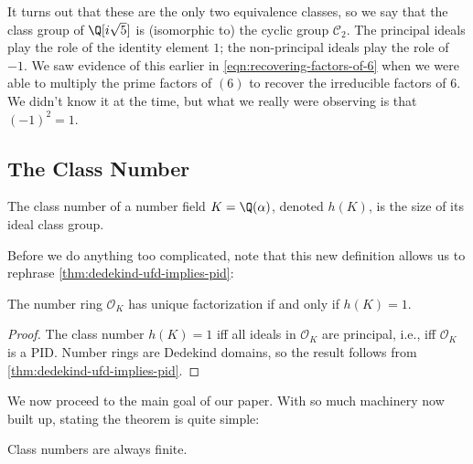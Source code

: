 It turns out that these are the only two equivalence classes, so we say that the class group of $\Q[i \sqrt 5]$ is (isomorphic to) the cyclic group $\mathcal C_2$.
The principal ideals play the role of the identity element $1$; the non-principal ideals play the role of $-1$.
We saw evidence of this earlier in \autoref{eqn:recovering-factors-of-6} when we were able to multiply the prime factors of $(6)$ to recover the irreducible factors of $6$.
We didn't know it at the time, but what we really were observing is that $(-1)^2 = 1$.

\subsection{The Class Number}

\begin{definition}
    The class number of a number field $K = \Q(\alpha)$, denoted $h(K)$, is the size of its ideal class group.
\end{definition}

Before we do anything too complicated, note that this new definition allows us to rephrase \autoref{thm:dedekind-ufd-implies-pid}:

\begin{theorem}
    The number ring $\mathcal O_K$ has unique factorization if and only if $h(K) = 1$.
\end{theorem}

\begin{proof}
    The class number $h(K) = 1$ iff all ideals in $\mathcal O_K$ are principal, i.e., iff $\mathcal O_K$ is a PID. Number rings are Dedekind domains, so the result follows from \autoref{thm:dedekind-ufd-implies-pid}.
\end{proof}

We now proceed to the main goal of our paper. With so much machinery now built up, stating the theorem is quite simple:

\begin{theorem}
    \label{thm:clas-number-finite}
    Class numbers are always finite.
\end{theorem}

